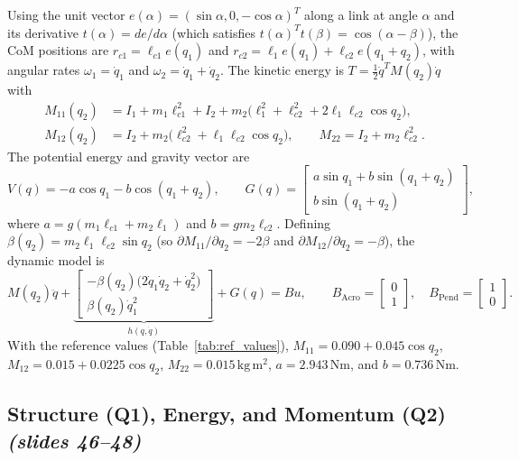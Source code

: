 \documentclass[11pt, a4paper]{article}
\theoremstyle{definition}
\theoremstyle{plain}
\begin{document}
Using the unit vector $e(\alpha) = (\sin\alpha, 0, -\cos\alpha)^T$ along a link at angle $\alpha$ and its derivative $t(\alpha) = de/d\alpha$ (which satisfies $t(\alpha)^T t(\beta) = \cos(\alpha - \beta)$), the CoM positions are $r_{c1} = \ell_{c1} e(q_1)$ and $r_{c2} = \ell_1 e(q_1) + \ell_{c2} e(q_1 + q_2)$, with angular rates $\omega_1 = \dot{q}_1$ and $\omega_2 = \dot{q}_1 + \dot{q}_2$. The kinetic energy is $T = \frac{1}{2}\dot{q}^T M(q_2)\dot{q}$ with
\begin{align*}
  M_{11}(q_2) &= I_1 + m_1 \ell_{c1}^2 + I_2 + m_2 \big(\ell_1^2 + \ell_{c2}^2 + 2\ell_1 \ell_{c2} \cos q_2\big), \\
  M_{12}(q_2) &= I_2 + m_2 \big(\ell_{c2}^2 + \ell_1 \ell_{c2} \cos q_2\big), \qquad
  M_{22} = I_2 + m_2 \ell_{c2}^2.
\end{align*}
The potential energy and gravity vector are
\[
  V(q) = -a \cos q_1 - b \cos(q_1 + q_2), \qquad
  G(q) = \begin{bmatrix} a\sin q_1 + b\sin(q_1 + q_2) \\ b\sin(q_1 + q_2) \end{bmatrix},
\]
where $a = g(m_1 \ell_{c1} + m_2 \ell_1)$ and $b = g m_2 \ell_{c2}$. Defining $\beta(q_2) = m_2 \ell_1 \ell_{c2} \sin q_2$ (so $\partial M_{11}/\partial q_2 = -2\beta$ and $\partial M_{12}/\partial q_2 = -\beta$), the dynamic model is
\begin{equation}
  M(q_2)\ddot{q}
  + \underbrace{\begin{bmatrix} -\beta(q_2)\big(2\dot{q}_1\dot{q}_2 + \dot{q}_2^2\big) \\ \beta(q_2)\dot{q}_1^2 \end{bmatrix}}_{h(q,\dot{q})}
  + G(q) = B u,
  \qquad
  B_{\text{Acro}} = \begin{bmatrix} 0 \\ 1 \end{bmatrix}, \quad
  B_{\text{Pend}} = \begin{bmatrix} 1 \\ 0 \end{bmatrix}.
  \label{eq:twolink}
\end{equation}
With the reference values (Table~\ref{tab:ref_values}), $M_{11} = 0.090 + 0.045\cos q_2$, $M_{12} = 0.015 + 0.0225\cos q_2$, $M_{22} = 0.015\,\mathrm{kg\,m^2}$, $a = 2.943\,\mathrm{Nm}$, and $b = 0.736\,\mathrm{Nm}$.

\subsection{Structure (Q1), Energy, and Momentum (Q2) \emph{(slides 46--48)}}
\end{document}
